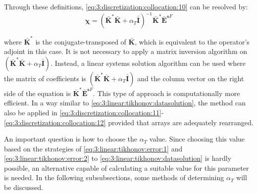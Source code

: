 			Through these definitions, \eqref{eq:3:discretization:collocation:10} can be resolved by:
			\begin{equation}
				\boldsymbol{\chi} = \left(\mathbf{\bar{K}}^*\mathbf{\bar{K}} + \alpha_T\mathbf{\bar{I}}\right)^{-1} \mathbf{\bar{K}}^*\mathbf{\bar{E}}^{\mathbf{s}F} \label{eq:3:linear:tikhonov:datasolution}
			\end{equation}
		
			\noindent where $\mathbf{\bar{K}}^*$ is the conjugate-transposed of $\mathbf{\bar{K}}$, which is equivalent to the operator's adjoint in this case. It is not necessary to apply a matrix inversion algorithm on $ \left(\mathbf{\bar{K}}^*\mathbf{\bar{K}} + \alpha_T\mathbf{\bar{I}}\right)$. Instead, a linear systems solution algorithm can be used where the matrix of coefficients is $\left(\mathbf{\bar{K}}^*\mathbf{\bar{K}} + \alpha_T\mathbf{\bar{I}}\right)$ and the column vector on the right side of the equation is $\mathbf{\bar{K}}^*\mathbf{\bar{E}}^{\mathbf{s}F}$. This type of approach is computationally more efficient. In a way similar to \eqref{eq:3:linear:tikhonov:datasolution}, the method can also be applied in \eqref{eq:3:discretization:collocation:11}-\eqref{eq:3:discretization:collocation:12} provided that arrays are adequately rearranged.
			
			An important question is how to choose the $\alpha_T$ value. Since choosing this value based on the strategies of \eqref{eq:3:linear:tikhonov:error:1} and \eqref{eq:3:linear:tikhonov:error:2} to \eqref{eq:3:linear:tikhonov:datasolution} is hardly possible, an alternative capable of calculating a suitable value for this parameter is needed. In the following subsubsections, some methods of determining $\alpha_{T}$ will be discussed.
				
